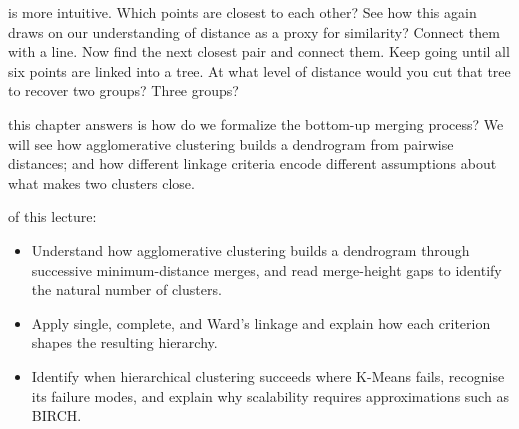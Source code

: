  is more intuitive. 
Which points are closest to each other?
See how this again draws on our understanding of distance as a proxy for similarity?
Connect them with a line.
Now find the next closest pair and connect them.
Keep going until all six points are linked into a tree.
At what level of distance would you cut that tree to recover two groups? Three groups?

\vspace{0.5em}

 this chapter answers is how do we formalize
the bottom-up merging process?
We will see how agglomerative clustering builds a dendrogram from pairwise distances;
and how different linkage criteria encode different assumptions about what makes two clusters close.

 of this lecture:
\begin{itemize}
    \item Understand how agglomerative clustering builds a dendrogram through successive minimum-distance merges, and read merge-height gaps to identify the natural number of clusters.
    \item Apply single, complete, and Ward's linkage and explain how each criterion shapes the resulting hierarchy.
    \item Identify when hierarchical clustering succeeds where K-Means fails, recognise its failure modes, and explain why scalability requires approximations such as BIRCH.
\end{itemize}











